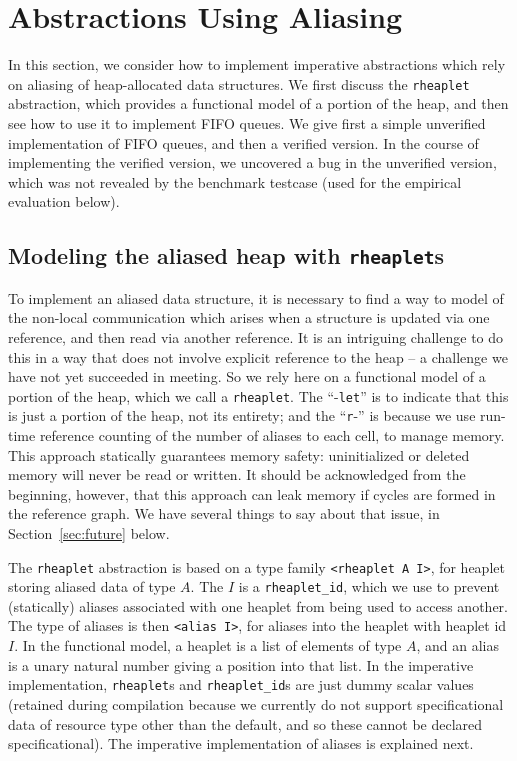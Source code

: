 \documentclass[9pt,natbib]{sigplanconf}
\begin{document}
\section{Abstractions Using Aliasing}

In this section, we consider how to implement imperative abstractions
which rely on aliasing of heap-allocated data structures.  We first
discuss the \texttt{rheaplet} abstraction, which provides a functional
model of a portion of the heap, and then see how to use it to implement
FIFO queues.  We give first a simple unverified implementation of FIFO
queues, and then a verified version.  In the course of implementing the
verified version, we uncovered a bug in the unverified version, which
was not revealed by the benchmark testcase (used for the empirical
evaluation below).

\subsection{Modeling the aliased heap with \texttt{rheaplet}s}

To implement an aliased data structure, it is necessary to find a way
to model of the non-local communication which arises when a structure
is updated via one reference, and then read via another reference.  It
is an intriguing challenge to do this in a way that does not involve
explicit reference to the heap -- a challenge we have not yet
succeeded in meeting.  So we rely here on a functional model of a
portion of the heap, which we call a \texttt{rheaplet}.  The
``-\texttt{let}'' is to indicate that this is just a portion of the
heap, not its entirety; and the ``\texttt{r}-'' is because we use
run-time reference counting of the number of aliases to each cell, to
manage memory.  This approach statically guarantees memory safety:
uninitialized or deleted memory will never be read or written.  It
should be acknowledged from the beginning, however, that this approach
can leak memory if cycles are formed in the reference graph.  We have
several things to say about that issue, in Section~\ref{sec:future}
below.  

The \texttt{rheaplet} abstraction is based on a type family
\texttt{<rheaplet A I>}, for heaplet storing aliased data of type $A$.
The $I$ is a \texttt{rheaplet\_id}, which we use to prevent
(statically) aliases associated with one heaplet from being used to
access another.  The type of aliases is then \texttt{<alias I>}, for
aliases into the heaplet with heaplet id $I$.  In the functional
model, a heaplet is a list of elements of type $A$, and an alias is a
unary natural number giving a position into that list.  In the
imperative implementation, \texttt{rheaplet}s and
\texttt{rheaplet\_id}s are just dummy scalar values (retained during
compilation because we currently do not support specificational data
of resource type other than the default, and so these cannot be
declared specificational).  The imperative implementation of aliases
is explained next.
\end{document}
